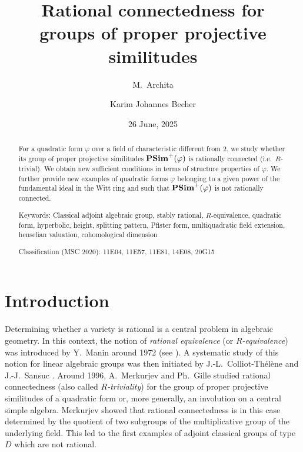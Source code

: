 \documentclass[twoside,11pt]{amsart}
\title[Rational connectedness for proper projective similitudes]{Rational connectedness for\\ groups of proper projective similitudes}
\date{26 June, 2025}
\author{M.~Archita}
\author{Karim Johannes Becher}
\numberwithin{equation}{section}
\theoremstyle{definition}
\newcommand{\vf}{\varphi}
\begin{document}
\maketitle

\begin{abstract}
    For a quadratic form $\varphi$ over a field of characteristic different from $2$, we study whether its group of proper projective similitudes ${\bf PSim}^+(\vf)$ is rationally connected (i.e.~$R$-trivial).
    We obtain new sufficient conditions in terms of structure properties of $\varphi$. We further provide new examples of quadratic forms $\varphi$ belonging to a given power of the fundamental ideal in the Witt ring and such that ${\bf PSim}^+(\vf)$ is not rationally connected. 

\medskip\noindent
{\sc Keywords:} 
Classical adjoint  algebraic group, stably rational, $R$-equivalence, quadratic form, hyperbolic,  height, splitting pattern, Pfister form, multiquadratic field extension, henselian valuation, cohomological dimension

\medskip\noindent
{\sc Classification (MSC 2020):} 11E04, %
11E57, %
11E81, %
14E08, %
20G15 %
\end{abstract}

\section{Introduction}

Determining whether a variety is rational is a central problem in algebraic geometry.
In this context, the notion of \emph{rational equivalence} (or \emph{$R$-equivalence}) was introduced by Y.~Manin around 1972 (see \cite[Chapter II, \S$14$]{Man86}). 
A systematic study of this notion for linear algebraic groups was then initiated by J.-L.~Colliot-Thélène and J.-J.~Sansuc \cite{CTS77}.
Around 1996, A.~Merkurjev \cite{Mer96} and Ph.~Gille \cite{Gil97} studied rational connectedness (also called \emph{$R$-triviality}) for the group of proper projective similitudes of a quadratic form or, more generally, an involution on a central simple algebra.
Merkurjev showed that rational connectedness is in this case determined by the quotient of two subgroups of the multiplicative group of the underlying field.
This led to the first examples of adjoint classical groups of type $D$ which are not rational.
\end{document}
